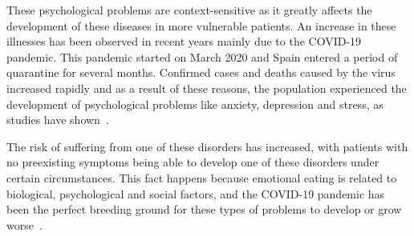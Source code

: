 
These psychological problems are context-sensitive as it greatly affects the development of these diseases in more vulnerable patients. An increase in these illnesses has been observed in recent years mainly due to the COVID-19 pandemic. This pandemic started on March 2020 and Spain entered a period of quarantine for several months. Confirmed cases and deaths caused by the virus increased rapidly and as a result of these reasons, the population experienced the development of psychological problems like anxiety, depression and stress, as studies have shown~\cite{ramirez2021repercusiones}.


The risk of suffering from one of these disorders has increased, with patients with no preexisting symptoms being able to develop one of these disorders under certain circumstances. This fact happens because emotional eating is related to biological, psychological and social factors, and the COVID-19 pandemic has been the perfect breeding ground for these types of problems to develop or grow worse~\cite{dos2022emotional}.




